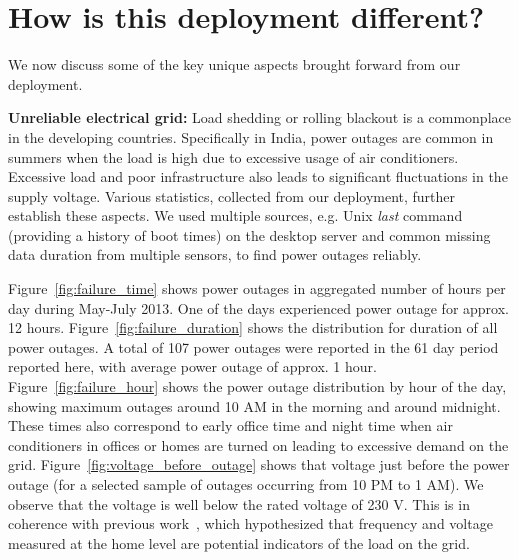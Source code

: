 \documentclass[10pt]{sensys-proc}
\newcommand{\figref}[1]{Figure~\ref{#1}}
\begin{document}
\vspace{-1mm}
\section{How is this deployment different?}
\label{sec:learning}
We now discuss some of the key unique aspects brought forward from our deployment. 

\noindent \textbf{Unreliable electrical grid:} Load shedding or rolling blackout is a commonplace in the developing countries. %
Specifically in India, power outages are common in summers when the load is high due to excessive usage of air conditioners. Excessive load and poor infrastructure also leads to significant fluctuations in the supply voltage. %
Various statistics, collected from our deployment, further establish these aspects. We used multiple sources, e.g. Unix \emph{last} command (providing a history of boot times) on the desktop server and common missing data duration from multiple sensors, to find power outages reliably. 

\figref{fig:failure_time} shows power outages in aggregated number of hours per day during May-July 2013. One of the days experienced power outage for approx. 12 hours. 
 \figref{fig:failure_duration} shows the distribution for duration of all power outages. A total of 107 power outages were reported in the 61 day period reported here, with average power outage of approx. 1 hour. %
\figref{fig:failure_hour} shows the power outage distribution by hour of the day, showing maximum outages around 10 AM in the morning and around midnight. These times also correspond to early office time and night time when air conditioners in offices or homes are turned on leading to excessive demand on the grid. \figref{fig:voltage_before_outage} shows that voltage just before the power outage (for a selected sample of outages occurring from 10 PM to 1 AM). We observe that the voltage is well below the rated voltage of 230 V. This is in coherence with previous work~\cite{nplug}, which hypothesized that frequency and voltage measured at the home level are potential indicators of the load on the grid.
\end{document}
